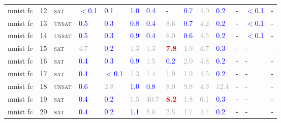 \begin{center}
{\begin{longtable}{@{}llllllllllllll@{}}
mnist fc & 12 & \textsc{sat} & \textcolor{blue}{$<$0.1} & \textcolor{blue}{0.1} & \textcolor{blue}{1.0} & \textcolor{blue}{0.4} & - & \textcolor{blue}{0.7} & \textcolor{darkgray}{4.0} & \textcolor{blue}{0.2} & - & \textcolor{blue}{$<$0.1} & - \\
mnist fc & 13 & \textsc{unsat} & \textcolor{blue}{0.5} & \textcolor{blue}{0.3} & \textcolor{blue}{0.8} & \textcolor{blue}{0.4} & \textcolor{darkgray}{8.6} & \textcolor{blue}{0.7} & \textcolor{darkgray}{4.2} & \textcolor{blue}{0.2} & - & \textcolor{blue}{$<$0.1} & - \\
mnist fc & 14 & \textsc{unsat} & \textcolor{blue}{0.5} & \textcolor{blue}{0.3} & \textcolor{blue}{0.9} & \textcolor{blue}{0.4} & \textcolor{darkgray}{8.0} & \textcolor{blue}{0.6} & \textcolor{darkgray}{4.5} & \textcolor{blue}{0.2} & - & \textcolor{blue}{$<$0.1} & - \\
mnist fc & 15 & \textsc{sat} & \textcolor{darkgray}{4.7} & \textcolor{blue}{0.2} & \textcolor{darkgray}{1.3} & \textcolor{darkgray}{1.3} & \textbf{\textcolor{red}{7.8}} & \textcolor{darkgray}{1.9} & \textcolor{darkgray}{4.7} & \textcolor{blue}{0.3} & - & - & - \\
mnist fc & 16 & \textsc{sat} & \textcolor{blue}{0.4} & \textcolor{blue}{0.3} & \textcolor{blue}{0.9} & \textcolor{darkgray}{1.5} & \textcolor{blue}{0.2} & \textcolor{darkgray}{2.0} & \textcolor{darkgray}{4.8} & \textcolor{blue}{0.2} & - & - & - \\
mnist fc & 17 & \textsc{sat} & \textcolor{blue}{0.4} & \textcolor{blue}{$<$0.1} & \textcolor{darkgray}{1.3} & \textcolor{darkgray}{1.4} & \textcolor{darkgray}{1.9} & \textcolor{darkgray}{1.9} & \textcolor{darkgray}{4.5} & \textcolor{blue}{0.2} & - & - & - \\
mnist fc & 18 & \textsc{unsat} & \textcolor{blue}{0.6} & \textcolor{darkgray}{2.8} & \textcolor{blue}{1.0} & \textcolor{blue}{0.8} & \textcolor{darkgray}{8.0} & \textcolor{darkgray}{9.8} & \textcolor{darkgray}{4.3} & \textcolor{darkgray}{12.4} & - & - & - \\
mnist fc & 19 & \textsc{sat} & \textcolor{blue}{0.4} & \textcolor{blue}{0.2} & \textcolor{darkgray}{1.5} & \textcolor{darkgray}{40.7} & \textbf{\textcolor{red}{8.2}} & \textcolor{darkgray}{1.8} & \textcolor{darkgray}{6.1} & \textcolor{blue}{0.3} & - & - & - \\
mnist fc & 20 & \textsc{sat} & \textcolor{blue}{0.4} & \textcolor{blue}{0.2} & \textcolor{blue}{1.1} & \textcolor{darkgray}{8.0} & \textcolor{darkgray}{2.5} & \textcolor{darkgray}{1.7} & \textcolor{darkgray}{4.7} & \textcolor{blue}{0.2} & - & - & - \\

\end{longtable}}
\end{center}

